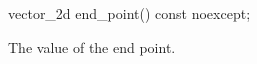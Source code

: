 \begin{itemdecl}
    vector_2d end_point() const noexcept;
\end{itemdecl}
\begin{itemdescr}
	\pnum
	\returns
	The value of the end point.
\end{itemdescr}
